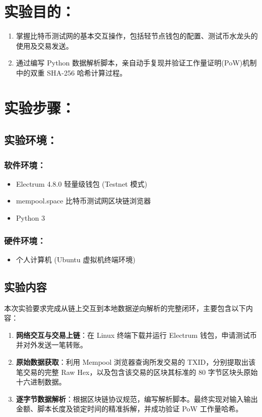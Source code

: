 \documentclass{sdureport}
\begin{document}
\begin{sduDocument}
	\section{实验目的：}
	\begin{enumerate}
		\renewcommand{\labelenumi}{(\theenumi)}
		\item 掌握比特币测试网的基本交互操作，包括轻节点钱包的配置、测试币水龙头的使用及交易发送。
		\item 通过编写 Python 数据解析脚本，亲自动手复现并验证工作量证明(PoW)机制中的双重 SHA-256 哈希计算过程。
	\end{enumerate}
	
	\section{实验步骤：}
	\subsection{实验环境：}
	\subsubsection{软件环境：}
	\begin{itemize}
		\item Electrum 4.8.0 轻量级钱包 (Testnet 模式)
		\item mempool.space 比特币测试网区块链浏览器
		\item Python 3
	\end{itemize}
	\subsubsection{硬件环境：}
	\begin{itemize}
		\item 个人计算机 (Ubuntu 虚拟机终端环境)
	\end{itemize}

	\subsection{实验内容}
	本次实验要求完成从链上交互到本地数据逆向解析的完整闭环，主要包含以下内容：
	\begin{enumerate}
		\renewcommand{\labelenumi}{(\theenumi)}
		\item \textbf{网络交互与交易上链}：在 Linux 终端下载并运行 Electrum 钱包，申请测试币并对外发送一笔转账。
		\item \textbf{原始数据获取}：利用 Mempool 浏览器查询所发交易的 TXID，分别提取出该笔交易的完整 Raw Hex，以及包含该交易的区块其标准的 80 字节区块头原始十六进制数据。
		\item \textbf{逐字节数据解析}：根据区块链协议规范，编写解析脚本。最终实现对输入输出金额、脚本长度及锁定时间的精准拆解，并成功验证 PoW 工作量哈希。
	\end{enumerate} 


\end{sduDocument}
\end{document}
